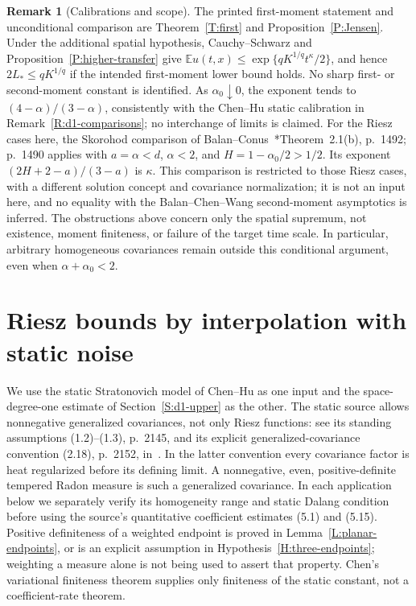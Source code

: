\documentclass[12pt]{article}
\numberwithin{equation}{section}
\theoremstyle{definition}
\newtheorem{remark}[theorem]{Remark}
\newcommand{\E}{\mathbb{E}}
\begin{document}
\begin{remark}[Calibrations and scope]\label{R:higher-calibrations}
  The printed first-moment statement and unconditional comparison are
  Theorem~\ref{T:first} and Proposition~\ref{P:Jensen}. Under the
  additional spatial hypothesis, Cauchy--Schwarz and
  Proposition~\ref{P:higher-transfer} give
  $\E u(t,x)\le\exp\{qK^{1/q}t^\kappa/2\}$, and hence
  $2L_*\le qK^{1/q}$ if the intended first-moment lower bound holds.
  No sharp first- or second-moment constant is
  identified. As $\alpha_0\downarrow0$, the exponent tends to
  $(4-\alpha)/(3-\alpha)$, consistently with the Chen--Hu static
  calibration in Remark~\ref{R:d1-comparisons}; no interchange of limits
  is claimed. For the Riesz cases here, the Skorohod comparison of
  Balan--Conus~\cite{balan.conus:16:intermittency}*{Theorem~2.1(b),
  p.~1492; p.~1490} applies with $a=\alpha<d$, $\alpha<2$, and
  $H=1-\alpha_0/2>1/2$. Its exponent
  $(2H+2-a)/(3-a)$ is $\kappa$. This comparison is restricted to
  those Riesz cases, with a different solution concept and covariance
  normalization; it is not an input here, and no equality with the
  Balan--Chen--Wang second-moment asymptotics is inferred. The
  obstructions above concern only the spatial supremum, not existence,
  moment finiteness, or failure of the target time scale. In particular,
  arbitrary homogeneous covariances remain outside this conditional
  argument, even when $\alpha+\alpha_0<2$.
\end{remark}

\section{Riesz bounds by interpolation with static noise}
\label{S:static-holder}


We use the static Stratonovich model of Chen--Hu as one input and the
space-degree-one estimate of Section~\ref{S:d1-upper} as the other.
The static source allows nonnegative generalized covariances, not only
Riesz functions: see its standing assumptions (1.2)--(1.3), p.~2145,
and its explicit generalized-covariance convention (2.18), p.~2152,
in~\cite{chen.hu:25:hyperbolic}. In the latter convention every covariance
factor is heat regularized before its defining limit. A nonnegative,
even, positive-definite tempered Radon measure is such a generalized
covariance. In each application below we separately verify its homogeneity
range and static Dalang condition before using the source's quantitative
coefficient estimates (5.1) and (5.15). Positive definiteness of a weighted
endpoint is proved in Lemma~\ref{L:planar-endpoints}, or is an explicit
assumption in Hypothesis~\ref{H:three-endpoints}; weighting a measure alone
is not being used to assert that property. Chen's variational finiteness
theorem supplies only finiteness of the static constant, not a
coefficient-rate theorem.
\end{document}
